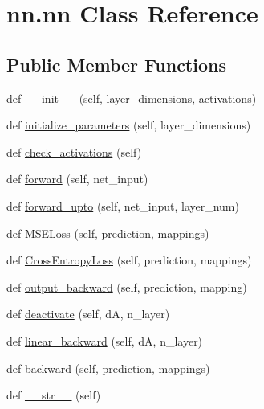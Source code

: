 \hypertarget{classnn_1_1nn}{}\section{nn.\+nn Class Reference}
\label{classnn_1_1nn}
\subsection*{Public Member Functions}
\begin{DoxyCompactItemize}
\item 
def \hyperlink{classnn_1_1nn_ad7304c7932970a07bf2869e97b79e0b5}{\+\_\+\+\_\+init\+\_\+\+\_\+} (self, layer\+\_\+dimensions, activations)
\item 
def \hyperlink{classnn_1_1nn_a9821fed1369b4d709fe297fe9e07d97b}{initialize\+\_\+parameters} (self, layer\+\_\+dimensions)
\item 
def \hyperlink{classnn_1_1nn_a15ee3f3e18ebae83c904b3441ece897d}{check\+\_\+activations} (self)
\item 
def \hyperlink{classnn_1_1nn_ae07002745b03901814d92ac66fe87781}{forward} (self, net\+\_\+input)
\item 
def \hyperlink{classnn_1_1nn_ac3d2b61ed992dc615eacda8e75a61a2b}{forward\+\_\+upto} (self, net\+\_\+input, layer\+\_\+num)
\item 
def \hyperlink{classnn_1_1nn_ae74a0f21e8722ea82a0f94135a81a348}{M\+S\+E\+Loss} (self, prediction, mappings)
\item 
def \hyperlink{classnn_1_1nn_a822299322a0b513f8985e61096be45bc}{Cross\+Entropy\+Loss} (self, prediction, mappings)
\item 
def \hyperlink{classnn_1_1nn_afa7d1462872fae95fe71f27ed00bf7ae}{output\+\_\+backward} (self, prediction, mapping)
\item 
def \hyperlink{classnn_1_1nn_a475811849fd370a47eb0e3b7bc09b283}{deactivate} (self, dA, n\+\_\+layer)
\item 
def \hyperlink{classnn_1_1nn_a0863e90359fa30486c7161cd31c5b4e7}{linear\+\_\+backward} (self, dA, n\+\_\+layer)
\item 
def \hyperlink{classnn_1_1nn_a53a7beb698fe127ebb1f636fccbaa126}{backward} (self, prediction, mappings)
\item 
def \hyperlink{classnn_1_1nn_a1c967a0ae06ef2a7e8077cc9aa29aabc}{\+\_\+\+\_\+str\+\_\+\+\_\+} (self)
\end{DoxyCompactItemize}
